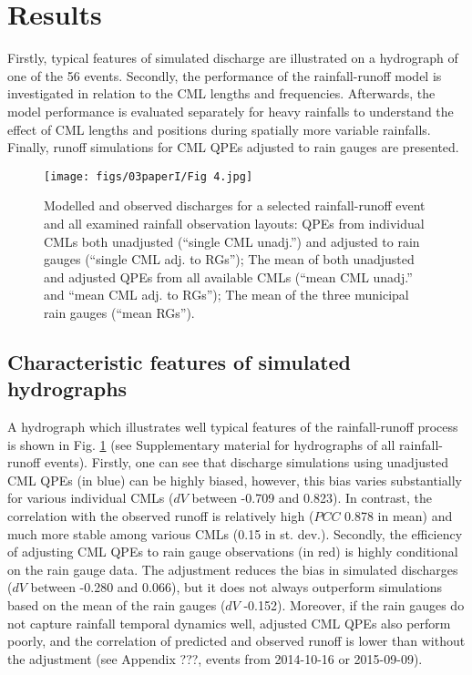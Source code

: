 \documentclass{ctuthesis}\usepackage[]{graphicx}\usepackage[]{color}
\begin{document}
\section{Results}

Firstly, typical features of simulated discharge are illustrated on a hydrograph of one of the 56 events. Secondly, the performance of the rainfall-runoff model is investigated in relation to the CML lengths and frequencies. Afterwards, the model performance is evaluated separately for heavy rainfalls to understand the effect of CML lengths and positions during spatially more variable rainfalls. Finally, runoff simulations for CML QPEs adjusted to rain gauges are presented.


\begin{figure}[H]
\begin{center}
\texttt{[image: figs/03paperI/Fig 4.jpg]}
\caption{Modelled and observed discharges for a selected rainfall-runoff event and all examined rainfall observation layouts: QPEs from individual CMLs both unadjusted (“single CML unadj.”) and adjusted to rain gauges (“single CML adj. to RGs”); The mean of both unadjusted and adjusted QPEs from all available CMLs (“mean CML unadj.” and “mean CML adj. to RGs”); The mean of the three municipal rain gauges (“mean RGs”).} \label{3fig4}
\end{center}
\end{figure}

\subsection{Characteristic features of simulated hydrographs}

A hydrograph which illustrates well typical features of the rainfall-runoff process is shown in Fig. \ref{3fig4} (see Supplementary material for hydrographs of all rainfall-runoff events). Firstly, one can see that discharge simulations using unadjusted CML QPEs (in blue) can be highly biased, however, this bias varies substantially for various individual CMLs ($dV$ between -0.709 and 0.823). In contrast, the correlation with the observed runoff is relatively high ($PCC$ 0.878 in mean) and much more stable among various CMLs (0.15 in st. dev.). Secondly, the efficiency of adjusting CML QPEs to rain gauge observations (in red) is highly conditional on the rain gauge data. The adjustment reduces the bias in simulated discharges ($dV$ between -0.280 and 0.066), but it does not always outperform simulations based on the mean of the rain gauges ($dV$ -0.152). Moreover, if the rain gauges do not capture rainfall temporal dynamics well, adjusted CML QPEs also perform poorly, and the correlation of predicted and observed runoff is lower than without the adjustment (see Appendix ???, events from 2014-10-16 or 2015-09-09).
\end{document}
